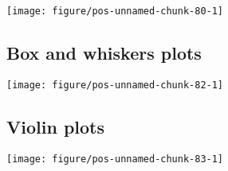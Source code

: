 \documentclass[paper=a4,headsepline,BCOR=12mm,twoside,open=right,%
titlepage,headings=small,fontsize=10pt,index=totoc,bibliography=totoc,%
captions=tableheading,captions=nooneline]{scrbook}\usepackage{knitr}
\begin{document}
\begin{knitrout}\footnotesize
{}\color{fgcolor}\begin{kframe}
\begin{alltt}
  \hlopt{+}
\hlstd{(}\hlstd{(}   \hlstd{=} \hlstd{)} \hlopt{+}
  \hlstd{(}\hlopt{~}
\end{alltt}
\end{kframe}

{\centering \texttt{[image: figure/pos-unnamed-chunk-80-1]} 

}



\end{knitrout}



\subsection{Box and whiskers plots}

\begin{knitrout}\footnotesize
{}\color{fgcolor}\begin{kframe}
\begin{alltt}
  \hlopt{+}
  \hlstd{()}
\end{alltt}
\end{kframe}

{\centering \texttt{[image: figure/pos-unnamed-chunk-82-1]} 

}



\end{knitrout}

\subsection{Violin plots}

\begin{knitrout}\footnotesize
{}\color{fgcolor}\begin{kframe}
\begin{alltt}
  \hlopt{+}
  \hlstd{()}
\end{alltt}
\end{kframe}

{\centering \texttt{[image: figure/pos-unnamed-chunk-83-1]} 

}



\end{knitrout}
\end{document}
